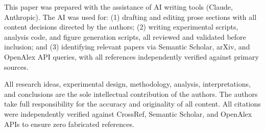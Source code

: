 This paper was prepared with the assistance of AI writing tools (Claude, Anthropic). The AI was used for: (1) drafting and editing prose sections with all content decisions directed by the authors; (2) writing experimental scripts, analysis code, and figure generation scripts, all reviewed and validated before inclusion; and (3) identifying relevant papers via Semantic Scholar, arXiv, and OpenAlex API queries, with all references independently verified against primary sources.

All research ideas, experimental design, methodology, analysis, interpretations, and conclusions are the sole intellectual contribution of the authors. The authors take full responsibility for the accuracy and originality of all content. All citations were independently verified against CrossRef, Semantic Scholar, and OpenAlex APIs to ensure zero fabricated references.
